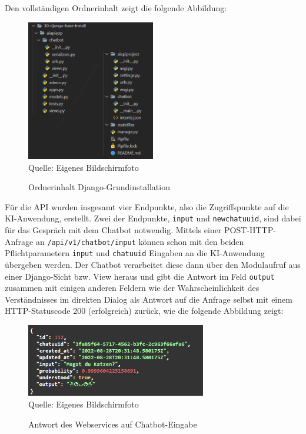 \documentclass[12pt,oneside,titlepage,listof=totoc,bibliography=totoc]{scrartcl}
\newcommand{\code}[1]{\colorbox{code-gray}{\texttt{#1}}}
\begin{document}
Den vollständigen Ordnerinhalt zeigt die folgende Abbildung: 

\begin{figure}[H]
	\caption{Ordnerinhalt Django-Grundinstallation}\label{fig:img-django-base-install}
	\includegraphics[width=0.5\textwidth]{django-folder.png}
	\\
	Quelle: Eigenes Bildschirmfoto
\end{figure}

Für die API wurden insgesamt vier Endpunkte, also die Zugriffspunkte auf die KI-Anwendung, erstellt. Zwei der Endpunkte, \code{input} und \code{newchatuuid}, sind dabei für das Gespräch mit dem Chatbot notwendig. Mittels einer POST-HTTP-Anfrage an \code{/api/v1/chatbot/input} können schon mit den beiden Pflichtparametern \code{input} und \code{chatuuid} Eingaben an die KI-Anwendung übergeben werden. Der Chatbot verarbeitet diese dann über den Modulaufruf aus einer Django-Sicht bzw. View heraus und gibt die Antwort im Feld \code{output} zusammen mit einigen anderen Feldern wie der Wahrscheinlichkeit des Verständnisses im direkten Dialog als Antwort auf die Anfrage selbst mit einem HTTP-Statuscode 200 (erfolgreich) zurück, wie die folgende Abbildung zeigt:

\begin{figure}[H]
	\caption{Antwort des Webservices auf Chatbot-Eingabe}\label{fig:img-cb-200-input}
	\includegraphics[width=0.7\textwidth]{status200-input.png}
	\\
	Quelle: Eigenes Bildschirmfoto
\end{figure}
\end{document}
